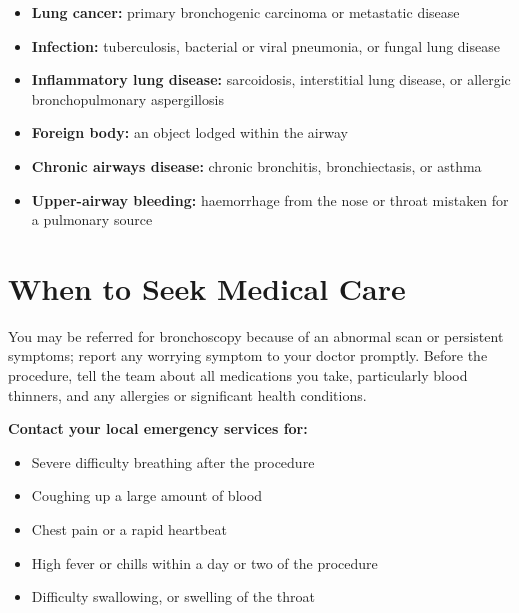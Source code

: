 \begin{itemize}
    \item \textbf{Lung cancer:} primary bronchogenic carcinoma or metastatic disease
    \item \textbf{Infection:} tuberculosis, bacterial or viral pneumonia, or fungal lung disease
    \item \textbf{Inflammatory lung disease:} sarcoidosis, interstitial lung disease, or allergic bronchopulmonary aspergillosis
    \item \textbf{Foreign body:} an object lodged within the airway
    \item \textbf{Chronic airways disease:} chronic bronchitis, bronchiectasis, or asthma
    \item \textbf{Upper-airway bleeding:} haemorrhage from the nose or throat mistaken for a pulmonary source
\end{itemize}

\section*{When to Seek Medical Care}
You may be referred for bronchoscopy because of an abnormal scan or persistent symptoms; report any worrying symptom to your doctor promptly. Before the procedure, tell the team about all medications you take, particularly blood thinners, and any allergies or significant health conditions.

\textbf{Contact your local emergency services for:}
\begin{itemize}
    \item Severe difficulty breathing after the procedure
    \item Coughing up a large amount of blood
    \item Chest pain or a rapid heartbeat
    \item High fever or chills within a day or two of the procedure
    \item Difficulty swallowing, or swelling of the throat
\end{itemize}


